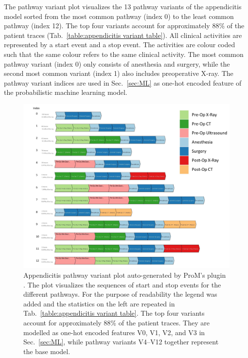 The pathway variant plot visualizes the 13 pathway variants of the
appendicitis model sorted from the most common pathway (index 0) to
the least common pathway (index 12).
The top four variants account for approximately 88\% of the patient
traces (Tab.~\ref{table:appendicitis variant table}).
All clinical activities are represented by a start event and a stop
event.
The activities are colour coded such that the same colour refers to the same clinical activity. The most common pathway variant (index 0) only consists of anesthesia and surgery, while the second most common variant (index 1) also includes preoperative X-ray.
The pathway variant indices are used in Sec.~\ref{sec:ML} as one-hot
encoded feature of the probabilistic machine learning model.

\begin{figure}[t]
\hspace{-2cm}
\includegraphics[width=1.5\textwidth]{images/appendicitis_variant_index_anes.jpg}
\caption{Appendicitis pathway variant plot auto-generated by ProM's
  plugin . 
  The plot visualizes the sequences of start and stop events for the different pathways.
  For the purpose of readability the legend was added and the
  statistics on the left are repeated in Tab.~\ref{table:appendicitis variant table}.
 The top four variants account for approximately 88\% of the patient
 traces. They are modelled as one-hot encoded features V0, V1, V2, and V3
 in Sec.~\ref{sec:ML}, while pathway variants V4--V12 together represent
 the base model.
 }
\label{fig:appendicitis pathway variants}
\end{figure}
\clearpage

